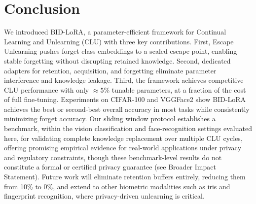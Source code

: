 \section{Conclusion}
\label{6}
We introduced BID-LoRA, a parameter-efficient framework for Continual Learning and Unlearning (CLU) with three key contributions. First, Escape Unlearning pushes forget-class embeddings to a scaled escape point, enabling stable forgetting without disrupting retained knowledge. Second, dedicated adapters for retention, acquisition, and forgetting eliminate parameter interference and knowledge leakage. Third, the framework achieves competitive CLU performance with only $\approx$5\% tunable parameters, at a fraction of the cost of full fine-tuning. Experiments on CIFAR-100 and VGGFace2 show BID-LoRA achieves the best or second-best overall accuracy in most tasks while consistently minimizing forget accuracy. Our sliding window protocol establishes a benchmark, within the vision classification and face-recognition settings evaluated here, for validating complete knowledge replacement over multiple CLU cycles, offering promising empirical evidence for real-world applications under privacy and regulatory constraints, though these benchmark-level results do not constitute a formal or certified privacy guarantee (see Broader Impact Statement). Future work will eliminate retention buffers entirely, reducing them from 10\% to 0\%, and extend to other biometric modalities such as iris and fingerprint recognition, where privacy-driven unlearning is critical.
